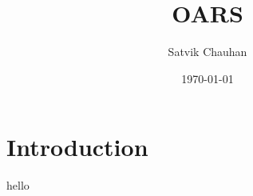 \documentclass[a4paper,12pt]{article}
\title{OARS}
\author{Satvik Chauhan}
\date{{\small \today}}
\begin{document}
\maketitle
\section{Introduction}
hello
\end{document}
